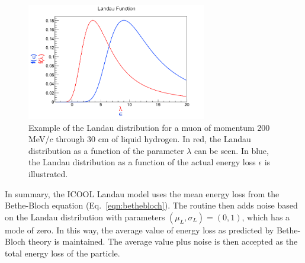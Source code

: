\begin{figure}[H]
  \centering
    \includegraphics[width=0.7\textwidth]{"Figures/landau example"} 
  \caption[Example of the Landau function.]{Example of the Landau distribution for a muon of momentum 200 MeV/$c$ through 30 cm of liquid hydrogen. In red, the Landau distribution as a function of the parameter $\lambda$ can be seen. In blue, the Landau distribution as a function of the actual energy loss $\epsilon$ is illustrated.}
  \label{fig:landau_example}
\end{figure}

In summary, the ICOOL Landau model uses the mean energy loss from the Bethe-Bloch equation (Eq.~\eqref{eqn:bethebloch}). The routine then adds noise based on the Landau distribution with parameters $(\mu_L,\sigma_L)=(0, 1)$, which has a mode of zero. In this way, the average value of energy loss as predicted by Bethe-Bloch theory is maintained. The average value plus noise is then accepted as the total energy loss of the particle.

